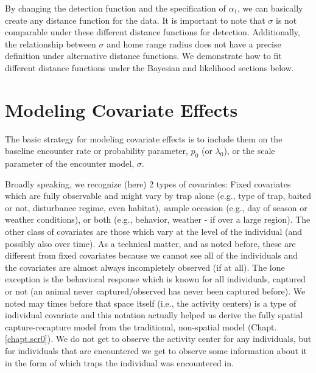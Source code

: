 By changing the detection function and the specification of
$\alpha_1$, we can basically create any distance function for the
data. It is important to note that $\sigma$ is not comparable under
these different distance functions for detection.  Additionally, the
relationship between $\sigma$ and home range radius does not have
a precise definition under alternative distance functions.  We
demonstrate how to fit different distance functions under the Bayesian
and likelihood sections below.


\section{Modeling Covariate Effects}


The basic strategy for modeling covariate effects is to include them
on the baseline encounter rate or probability parameter, $p_{0}$ (or
$\lambda_{0}$), or the scale parameter of the encounter model,
$\sigma$.

Broadly speaking, we recognize (here) 2 types of covariates: Fixed
covariates which are fully observable and might vary by trap alone (e.g.,
type of trap, baited or not, disturbance regime, even habitat), sample
occasion (e.g., day of season or weather conditions), or both (e.g.,
behavior, weather - if over a large region).  The other class of
covariates are those which vary at the level of the individual (and
possibly also over time).  As a technical matter, and as noted before, these are different
from fixed covariates because we cannot see all of the individuals and
the covariates are almost always incompletely observed (if at all).
The lone exception is the behavioral response which is known for all
individuals, captured or not (an animal never captured/observed has never been captured before).  We noted may times before that space
itself (i.e., the activity centers) is a type of individual
covariate and this notation actually helped us derive the fully spatial capture-recapture model from the traditional, non-spatial model (Chapt. \ref{chapt.scr0}). We do not get to observe the activity center for any
individuals, but for individuals that are encountered we get to
observe some information about it in the form of which traps the
individual was encountered in.


